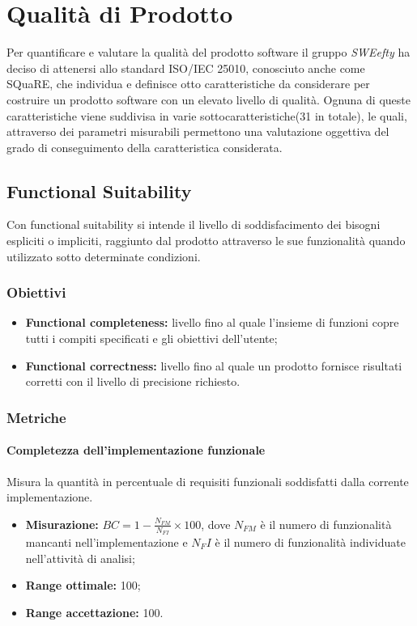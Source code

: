 \section{Qualità di Prodotto}
\label{sec:qdpr}
Per quantificare e valutare la qualità del prodotto software il gruppo \textit{SWEefty} ha deciso di attenersi allo standard ISO/IEC 25010, conosciuto anche come SQuaRE, che individua e definisce otto caratteristiche da considerare per costruire un prodotto software con un elevato livello di qualità. Ognuna di queste caratteristiche viene suddivisa in varie sottocaratteristiche(31 in totale), le quali, attraverso dei parametri misurabili  permettono una valutazione oggettiva del grado di conseguimento della caratteristica considerata.
 
	\subsection{Functional Suitability}
	Con functional suitability si intende il livello di soddisfacimento dei bisogni espliciti o impliciti, raggiunto dal prodotto attraverso le sue funzionalità quando utilizzato sotto determinate condizioni.
		\subsubsection{Obiettivi}
			\begin{itemize}
				\item {\textbf{Functional completeness:} livello fino al quale l'insieme di funzioni copre tutti i compiti specificati e gli obiettivi dell'utente;}
				\item {\textbf{Functional correctness:} livello fino al quale un prodotto fornisce risultati corretti con il livello di precisione richiesto.}
			\end{itemize}
		\subsubsection{Metriche}
			\paragraph{Completezza dell'implementazione funzionale}\Spazio
			 Misura la quantità in percentuale di requisiti funzionali soddisfatti dalla corrente implementazione.
			\begin{itemize}
				\item {\textbf{Misurazione:}  $BC=1-\frac{N_{FM}}{N_{FI}}\times 100$, dove $N_{FM}$  è il numero di funzionalità mancanti nell'implementazione e $N_FI$ è il numero di funzionalità individuate nell'attività di analisi};
				\item {\textbf{Range ottimale:} 100;}
				\item {\textbf{Range accettazione:} 100.}
			\end{itemize} 

